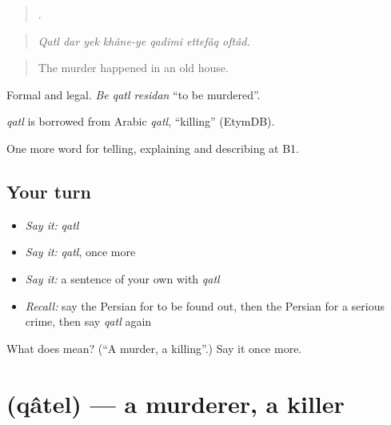 \begin{quote}
      .
\end{quote}

\begin{quote}
\emph{Qatl dar yek khâne-ye qadimi ettefâq oftâd.}
\end{quote}

\begin{quote}
The murder happened in an old house.
\end{quote}

Formal and legal. \emph{Be qatl residan} \textquotedblleft{}to be murdered\textquotedblright{}.

\begin{cousinweb}
\emph{qatl} is borrowed from Arabic \emph{qatl}, \textquotedblleft{}killing\textquotedblright{} (EtymDB).
\end{cousinweb}

\begin{grammarlens}[title={What you've built}]
One more word for telling, explaining and describing at B1.
\end{grammarlens}

\subsection*{Your turn}
\begin{itemize}
\raggedright
  \item \emph{Say it:} \emph{qatl}
  \item \emph{Say it:} \emph{qatl}, once more
  \item \emph{Say it:} a sentence of your own with \emph{qatl}
  \item \emph{Recall:} say the Persian for to be found out, then the Persian for a serious crime, then say \emph{qatl} again
\end{itemize}

\begin{tcolorbox}[breakable,colback=teal!4,colframe=teal!35!black,title={Before you move on}]
What does  mean? (\textquotedblleft{}A murder, a killing\textquotedblright{}.) Say it once more.
\end{tcolorbox}
\section[\texorpdfstring{\fa{قاتل} (qâtel)}{قاتل (qâtel)}]{ (qâtel) — a murderer, a killer}

